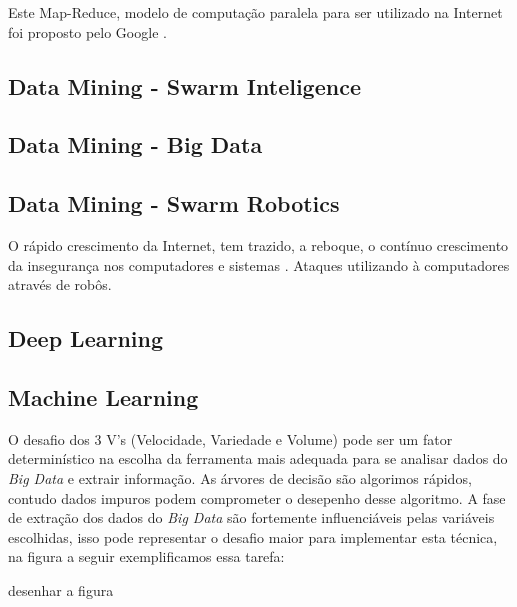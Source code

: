\documentclass[conference,compsoc]{IEEEtran}
\begin{document}
Este Map-Reduce, modelo de computação paralela para ser utilizado na Internet foi proposto pelo Google
\cite{Dean2008}.

\subsection{Data Mining - Swarm Inteligence}\label{arte:palavraChave:Swarm}

\subsection{Data Mining - Big Data}\label{arte:palavraChave:DataMiningBigData}

\subsection{Data Mining - Swarm Robotics}\label{arte:palavraChave:Robotics}

O rápido crescimento da Internet, tem trazido, a reboque, o contínuo crescimento da insegurança nos computadores e sistemas \cite{Barford2007}.
Ataques utilizando à computadores através de robôs.

\subsection{Deep Learning}\label{arte:palavraChave:Deep}



\subsection{Machine Learning}\label{arte:palavraChave:Machine}

O desafio dos 3 V's (Velocidade, Variedade e Volume) pode ser um fator determinístico na escolha da ferramenta mais adequada para se analisar dados do \textit{Big Data} e extrair informação. As árvores de decisão são algorimos rápidos, contudo dados impuros podem comprometer o desepenho desse algoritmo. A fase de extração dos dados do \textit{Big Data} são fortemente influenciáveis pelas variáveis escolhidas, \cite{DecisionTree} isso pode representar o desafio maior para implementar esta técnica, na figura a seguir exemplificamos essa tarefa:

desenhar a figura

\end{document}
